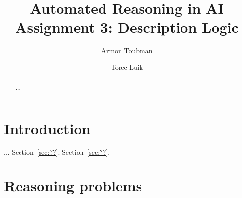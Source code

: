 \documentclass[11pt]{article} %
\title{Automated Reasoning in AI\\
Assignment 3: Description Logic}
\author{Armon Toubman \and Torec Luik}
\begin{document}
\maketitle

\begin{abstract}
...
\end{abstract}

\section{Introduction}
\label{sec:intro}
... Section~\ref{sec:??}. Section~\ref{sec:??}.

\begin{table}[htbp]
\caption{Overbodige Sudoku}
    \label{tab:sudoku_initial}
    \begin{center}
    \end{center}
\end{table}


\section{Reasoning problems}
\label{sec:2}
\end{document}
